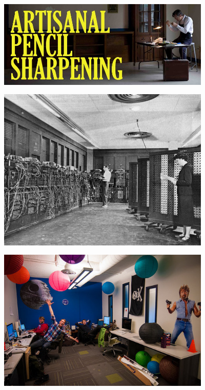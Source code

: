 \documentclass{beamer}
\begin{document}
\begin{frame}
\centering
\includegraphics[width=4in]{pencil.jpg}
\end{frame}

\begin{frame}
\centering
\includegraphics[width=4in]{eniac.jpg}
\end{frame}


\begin{frame}
\centering
\includegraphics[width=4in]{startup.jpg}
\end{frame}
\end{document}
